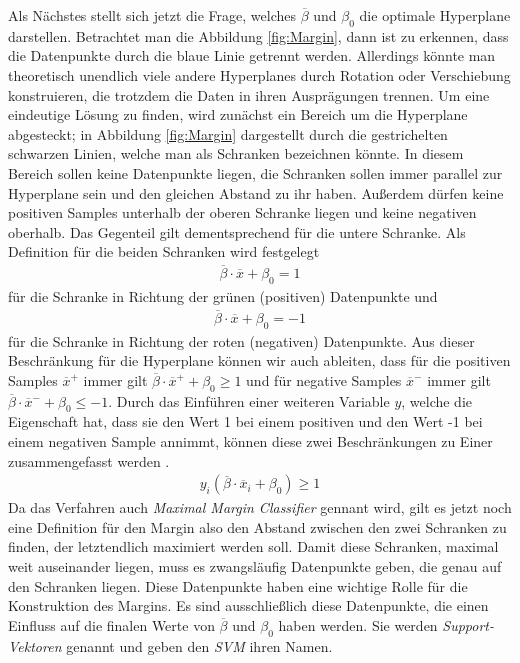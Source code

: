 \documentclass[
]{article}
\begin{document}
Als Nächstes stellt sich jetzt die Frage, welches \(\overline{\beta}\)
und \(\beta_0\) die optimale Hyperplane darstellen. Betrachtet man die
Abbildung \ref{fig:Margin}, dann ist zu erkennen, dass die Datenpunkte
durch die blaue Linie getrennt werden. Allerdings könnte man theoretisch
unendlich viele andere Hyperplanes durch Rotation oder Verschiebung
konstruieren, die trotzdem die Daten in ihren Ausprägungen trennen. Um
eine eindeutige Lösung zu finden, wird zunächst ein Bereich um die
Hyperplane abgesteckt; in Abbildung \ref{fig:Margin} dargestellt durch
die gestrichelten schwarzen Linien, welche man als Schranken bezeichnen
könnte. In diesem Bereich sollen keine Datenpunkte liegen, die Schranken
sollen immer parallel zur Hyperplane sein und den gleichen Abstand zu
ihr haben. Außerdem dürfen keine positiven Samples unterhalb der oberen
Schranke liegen und keine negativen oberhalb. Das Gegenteil gilt
dementsprechend für die untere Schranke. Als Definition für die beiden
Schranken wird festgelegt \begin{align}
\overline{\beta}\cdot \overline{x}+\beta_0=1\label{eq:posSV}
\end{align} für die Schranke in Richtung der grünen (positiven)
Datenpunkte und \begin{align}
\overline{\beta}\cdot \overline{x}+\beta_0=-1\label{eq:negSV}
\end{align} für die Schranke in Richtung der roten (negativen)
Datenpunkte. Aus dieser Beschränkung für die Hyperplane können wir auch
ableiten, dass für die positiven Samples \(\overline{x}^+\) immer gilt
\(\overline{\beta}\cdot \overline{x}^++\beta_0\ge 1\) und für negative
Samples \(\overline{x}^-\) immer gilt
\(\overline{\beta}\cdot \overline{x}^-+\beta_0\le -1\). Durch das
Einführen einer weiteren Variable \(y\), welche die Eigenschaft hat,
dass sie den Wert 1 bei einem positiven und den Wert -1 bei einem
negativen Sample annimmt, können diese zwei Beschränkungen zu Einer
zusammengefasst werden \parencite{cortesSupportvectorNetworks1995}.
\begin{align}
y_i(\overline{\beta}\cdot \overline{x}_i+\beta_0)\ge 1\label{eq:Nebenbedingung}
\end{align} Da das Verfahren auch \textit{Maximal Margin Classifier}
gennant wird, gilt es jetzt noch eine Definition für den Margin also den
Abstand zwischen den zwei Schranken zu finden, der letztendlich
maximiert werden soll. Damit diese Schranken, maximal weit auseinander
liegen, muss es zwangsläufig Datenpunkte geben, die genau auf den
Schranken liegen. Diese Datenpunkte haben eine wichtige Rolle für die
Konstruktion des Margins. Es sind ausschließlich diese Datenpunkte, die
einen Einfluss auf die finalen Werte von \(\overline{\beta}\) und
\(\beta_0\) haben werden. Sie werden \textit{Support-Vektoren} genannt
und geben den \textit{SVM} ihren Namen.
\end{document}
